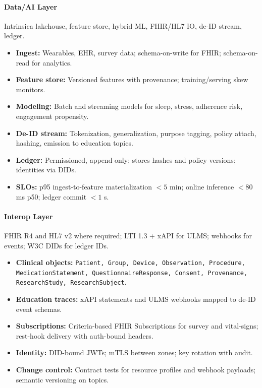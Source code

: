 \documentclass[11pt]{article}
\theoremstyle{plain}
\begin{document}
\paragraph{Data/AI Layer}
Intrinsica lakehouse, feature store, hybrid ML, FHIR/HL7 IO, de-ID stream, ledger.
\begin{itemize}
  \item \textbf{Ingest:} Wearables, EHR, survey data; schema-on-write for FHIR; schema-on-read for analytics.
  \item \textbf{Feature store:} Versioned features with provenance; training/serving skew monitors.
  \item \textbf{Modeling:} Batch and streaming models for sleep, stress, adherence risk, engagement propensity.
  \item \textbf{De-ID stream:} Tokenization, generalization, purpose tagging, policy attach, hashing, emission to education topics.
  \item \textbf{Ledger:} Permissioned, append-only; stores hashes and policy versions; identities via DIDs.
  \item \textbf{SLOs:} p95 ingest-to-feature materialization \(<5\) min; online inference \(<80\) ms p50; ledger commit \(<1\) s.
\end{itemize}

\paragraph{Interop Layer}
FHIR R4 and HL7 v2 where required; LTI 1.3 + xAPI for ULMS; webhooks for events; W3C DIDs for ledger IDs.
\begin{itemize}
  \item \textbf{Clinical objects:} \texttt{Patient, Group, Device, Observation, Procedure, MedicationStatement, QuestionnaireResponse, Consent, Provenance, ResearchStudy, ResearchSubject}.
  \item \textbf{Education traces:} xAPI statements and ULMS webhooks mapped to de-ID event schemas.
  \item \textbf{Subscriptions:} Criteria-based FHIR Subscriptions for survey and vital-signs; rest-hook delivery with auth-bound headers.
  \item \textbf{Identity:} DID-bound JWTs; mTLS between zones; key rotation with audit.
  \item \textbf{Change control:} Contract tests for resource profiles and webhook payloads; semantic versioning on topics.
\end{itemize}
\end{document}
